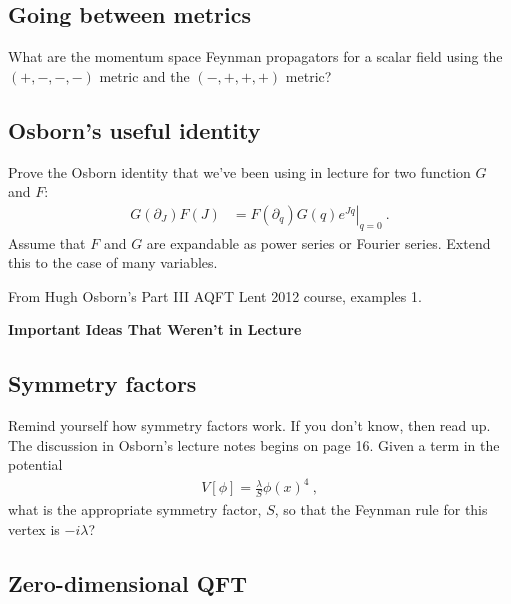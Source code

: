 \documentclass[12pt]{article}
\numberwithin{equation}{subsection}    %
\begin{document}
\subsection{Going between metrics}

What are the momentum space Feynman propagators for a scalar field using the $(+,-,-,-)$ metric and the $(-,+,+,+)$ metric?


\subsection{Osborn's useful identity}

Prove the Osborn identity that we've been using in lecture for two function $G$ and $F$:
\begin{align}
	G(\partial_J)F(J)
	&= 
	\left.
	F(\partial_q)G(q)
	e^{Jq}
	\right|_{q=0} \ .
\end{align}
Assume that $F$ and $G$ are expandable as power series or Fourier series. Extend this to the case of many variables. 

{\footnotesize From Hugh Osborn's Part III AQFT Lent 2012 course, examples 1.}



\newpage
{\Large \bf \sffamily Important Ideas That Weren't in Lecture}
\vspace{-1em}

\subsection{Symmetry factors}

Remind yourself how symmetry factors work. If you don't know, then read up. The discussion in Osborn's lecture notes begins on page 16. Given a term in the potential 
\begin{align}
	V[\phi] = \frac{\lambda}{S}\phi(x)^4 \ ,
\end{align}
what is the appropriate symmetry factor, $S$, so that the Feynman rule for this vertex is $-i\lambda$?

\subsection{Zero-dimensional QFT}
\end{document}
